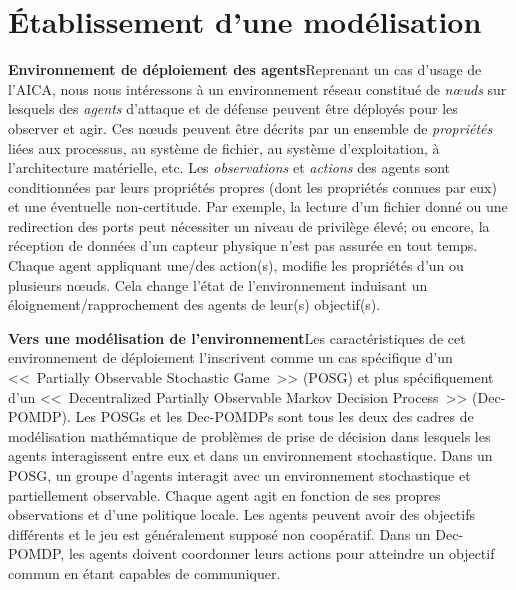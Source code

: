 \section{Établissement d'une modélisation}

\textbf{Environnement de déploiement des agents}\qquad Reprenant un cas d'usage de l'AICA\cite{theron_autonomous_2021}, nous nous intéressons à un environnement réseau constitué de \textit{nœuds} sur lesquels des \textit{agents} d'attaque et de défense peuvent être déployés pour les observer et agir. Ces nœuds peuvent être décrits par un ensemble de \textit{propriétés} liées aux processus, au système de fichier, au système d'exploitation, à l'architecture matérielle, etc.
Les \textit{observations} et \textit{actions} des agents sont conditionnées par leurs propriétés propres (dont les propriétés connues par eux) et une éventuelle non-certitude. Par exemple, la lecture d'un fichier donné ou une redirection des ports peut nécessiter un niveau de privilège élevé; ou encore, la réception de données d'un capteur physique n'est pas assurée en tout temps.
Chaque agent appliquant une/des action(s), modifie les propriétés d'un ou plusieurs nœuds. Cela change l'état de l'environnement induisant un éloignement/rapprochement des agents de leur(s) objectif(s).

\textbf{Vers une modélisation de l'environnement}\quad Les caractéristiques de cet environnement de déploiement l'inscrivent comme un cas spécifique d'un <<~Partially Observable Stochastic Game~>> (POSG) et plus spécifiquement d'un <<~Decentralized Partially Observable Markov Decision Process~>> (Dec-POMDP).
Les POSGs et les Dec-POMDPs sont tous les deux des cadres de modélisation mathématique de problèmes de prise de décision dans lesquels les agents interagissent entre eux et dans un environnement stochastique\cite{beynier2010}. Dans un POSG, un groupe d'agents interagit avec un environnement stochastique et partiellement observable. Chaque agent agit en fonction de ses propres observations et d'une politique locale. Les agents peuvent avoir des objectifs différents et le jeu est généralement supposé non coopératif\cite{jk2020}.
Dans un Dec-POMDP, les agents doivent coordonner leurs actions pour atteindre un objectif commun en étant capables de communiquer\cite{bernstein2013}.

\

